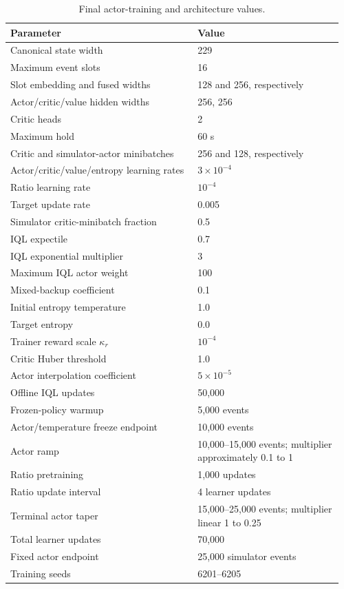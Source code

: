 \begin{table}[tp]
\centering
\small
\caption{Final actor-training and architecture values.}
\label{tab:hparams}
\begin{tabular}{@{}p{0.54\linewidth}p{0.42\linewidth}@{}}
\toprule
Parameter & Value \\
\midrule
Canonical state width & 229 \\
Maximum event slots & 16 \\
Slot embedding and fused widths & 128 and 256, respectively \\
Actor/critic/value hidden widths & 256, 256 \\
Critic heads & 2 \\
Maximum hold & 60 s \\
Critic and simulator-actor minibatches & 256 and 128, respectively \\
Actor/critic/value/entropy learning rates & $3\times10^{-4}$ \\
Ratio learning rate & $10^{-4}$ \\
Target update rate & 0.005 \\
Simulator critic-minibatch fraction & 0.5 \\
IQL expectile & 0.7 \\
IQL exponential multiplier & 3 \\
Maximum IQL actor weight & 100 \\
Mixed-backup coefficient & 0.1 \\
Initial entropy temperature & 1.0 \\
Target entropy & 0.0 \\
Trainer reward scale $\kappa_r$ & $10^{-4}$ \\
Critic Huber threshold & 1.0 \\
Actor interpolation coefficient & $5\times10^{-5}$ \\
Offline IQL updates & 50,000 \\
Frozen-policy warmup & 5,000 events \\
Actor/temperature freeze endpoint & 10,000 events \\
Actor ramp & 10,000--15,000 events; multiplier approximately 0.1 to 1 \\
Ratio pretraining & 1,000 updates \\
Ratio update interval & 4 learner updates \\
Terminal actor taper & 15,000--25,000 events; multiplier linear 1 to 0.25 \\
Total learner updates & 70,000 \\
Fixed actor endpoint & 25,000 simulator events \\
Training seeds & 6201--6205 \\
\bottomrule
\end{tabular}
\end{table}

